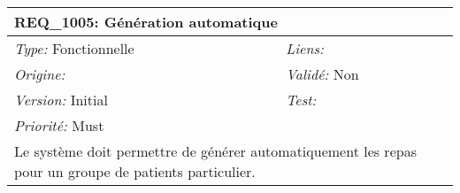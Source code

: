 \begin{table}[!h]

\begin{tabular}{|p{60mm}p{100mm}|}

\hline

\multicolumn{2}{|l|}{\textbf{REQ\_1005:} Génération automatique} \\ \hline

\emph{Type:} Fonctionnelle & \emph{Liens:}  \\

\emph{Origine:}  & \emph{Validé:} Non \\

\emph{Version:} Initial & \emph{Test:}  \\

\emph{Priorité:} Must & \\ \hline

\multicolumn{2}{|p{16cm}|}{Le système doit permettre de générer automatiquement les repas pour un groupe de patients particulier.} \\ \hline

\end{tabular}

\end{table}



